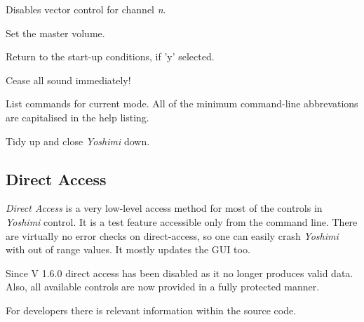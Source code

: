       Disables vector control for channel \textsl{n}.

      Set the master volume.

      Return to the start-up conditions, if 'y' selected.

      Cease all sound immediately!

      List commands for current mode.  All of the minimum command-line
      abbrevations are capitalised in the help listing.

         Tidy up and close \textsl{Yoshimi} down.

\subsection{Direct Access}
\label{subsec:command_line_direct_access}

   \textsl{Direct Access} is a very low-level access method for most of the
   controls in \textsl{Yoshimi} control.
   It is a test feature accessible only from the command line.
   There are virtually no error checks on direct-access, so one can easily
   crash \textsl{Yoshimi} with out of range values.
   It mostly updates the GUI too.


    Since V 1.6.0 direct access has been disabled as it no longer produces
    valid data. Also, all available controls are now provided in a fully
    protected manner.

   For developers there is relevant information within the source code.

